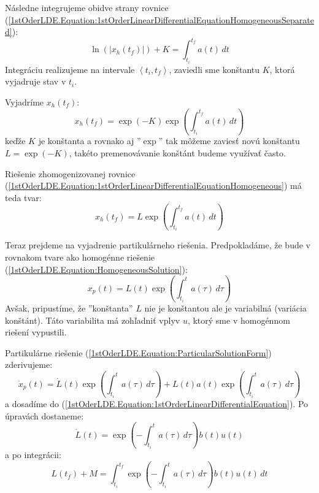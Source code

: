 \documentclass[a4paper, 10pt, ]{article}
\begin{document}
\noindent Následne integrujeme obidve strany rovnice (\ref{1stOderLDE.Equation:1stOrderLinearDifferentialEquationHomogeneousSeparated}):
\begin{equation}
    \label{1stOrderLDE.Equation:HomogeneousIntegral}
    \ln \left( |x_h(t_f)| \right) + K = \int_{t_i}^{t_f} a(t) \, dt
\end{equation}
Integráciu realizujeme na intervale $\left< t_i, t_f \right>$, zaviedli sme konštantu $K$, ktorá vyjadruje stav v $t_i$.

Vyjadríme $x_h(t_f)$:
\begin{equation}
    x_h(t_f) = \exp(-K) \exp \left( \int_{t_i}^{t_f} a(t) \, dt \right)
\end{equation}
keďže $K$ je konštanta a rovnako aj ''$\exp$'' tak môžeme zaviesť novú konštantu $L = \exp(-K)$, takéto premenovávanie konštánt budeme využívať často.

Riešenie zhomogenizovanej rovnice (\ref{1stOderLDE.Equation:1stOrderLinearDifferentialEquationHomogeneous}) má teda tvar:
\begin{equation}
    \label{1stOderLDE.Equation:HomogeneousSolution}
    x_h(t_f) = L \exp \left( \int_{t_i}^{t_f} a(t) \, dt \right)
\end{equation}

Teraz prejdeme na vyjadrenie partikulárneho riešenia. Predpokladáme, že bude v rovnakom tvare ako homogénne riešenie (\ref{1stOderLDE.Equation:HomogeneousSolution}):
\begin{equation}
    \label{1stOderLDE.Equation:ParticularSolutionForm}
    x_p(t) = L(t) \exp \left( \int_{t_i}^{t} a(\tau) \, d\tau \right)
\end{equation}
Avšak, pripustíme, že ''konštanta'' $L$ nie je konštantou ale je variabilná (variácia konštánt). Táto variabilita má zohľadniť vplyv $u$, ktorý sme v homogénnom riešení vypustili.

Partikulárne riešenie (\ref{1stOderLDE.Equation:ParticularSolutionForm}) zderivujeme:
\begin{equation}
    \dot{x}_p(t) = 
    \dot{L}(t) \exp \left( \int_{t_i}^{t} a(\tau) \, d\tau \right) + 
    L(t) a(t) \exp \left( \int_{t_i}^{t} a(\tau) \, d\tau \right)
\end{equation}
a dosadíme do (\ref{1stOderLDE.Equation:1stOrderLinearDifferentialEquation}). Po úpravách dostaneme:
\begin{equation}
    \dot{L}(t)  = 
    \exp \left( -\int_{t_i}^{t} a(\tau) \, d\tau \right) b(t) u(t)
\end{equation}
a po integrácii:
\begin{equation}
    \label{1stOderLDE.Equation:ConstantVariation}
    L(t_f) + M = \int_{t_i}^{t_f} \exp \left( -\int_{t_i}^{t} a(\tau) \, d\tau \right) b(t) u(t) \, dt
\end{equation}
\end{document}
